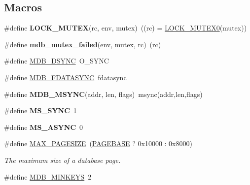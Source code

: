 \subsection*{Macros}
\begin{DoxyCompactItemize}
\item 
\mbox{\label{group__internal_ga8be40a35f7b587a458a860386ad6f368}} 
\#define {\bfseries L\+O\+C\+K\+\_\+\+M\+U\+T\+EX}(rc,  env,  mutex)~((rc) = \mbox{\hyperlink{group__compat_gac26452435f8ed1bce951b254b436d8d0}{L\+O\+C\+K\+\_\+\+M\+U\+T\+E\+X0}}(mutex))
\item 
\mbox{\label{group__internal_gaacbab5478905e1eadabacc0413655c06}} 
\#define {\bfseries mdb\+\_\+mutex\+\_\+failed}(env,  mutex,  rc)~(rc)
\item 
\#define \mbox{\hyperlink{group__internal_gafda79679e03da9d0d26c8f6fd74d2f2f}{M\+D\+B\+\_\+\+D\+S\+Y\+NC}}~O\+\_\+\+S\+Y\+NC
\item 
\#define \mbox{\hyperlink{group__internal_gaa42162368bc12873dcb1d1b9383a5ac0}{M\+D\+B\+\_\+\+F\+D\+A\+T\+A\+S\+Y\+NC}}~fdatasync
\item 
\mbox{\label{group__internal_ga8c53e57bbaa9a196f3643ecbde44aea3}} 
\#define {\bfseries M\+D\+B\+\_\+\+M\+S\+Y\+NC}(addr,  len,  flags)~msync(addr,len,flags)
\item 
\mbox{\label{group__internal_gaee74e153705852ce48dca911f1b94d72}} 
\#define {\bfseries M\+S\+\_\+\+S\+Y\+NC}~1
\item 
\mbox{\label{group__internal_ga98930d8c4137a6cf3f9e21b2b7c84c24}} 
\#define {\bfseries M\+S\+\_\+\+A\+S\+Y\+NC}~0
\item 
\#define \mbox{\hyperlink{group__internal_ga68765f8fe2a921fb43537502f7ff09b6}{M\+A\+X\+\_\+\+P\+A\+G\+E\+S\+I\+ZE}}~(\mbox{\hyperlink{group__internal_ga42d35f5d5bf3f161dc064ac7f78a2838}{P\+A\+G\+E\+B\+A\+SE}} ? 0x10000 \+: 0x8000)
\begin{DoxyCompactList}\small\item\em The maximum size of a database page. \end{DoxyCompactList}\item 
\#define \mbox{\hyperlink{group__internal_ga8384281689ac8f7b6ffc9c727025dbf0}{M\+D\+B\+\_\+\+M\+I\+N\+K\+E\+YS}}~2
\item 

\end{DoxyCompactItemize}
